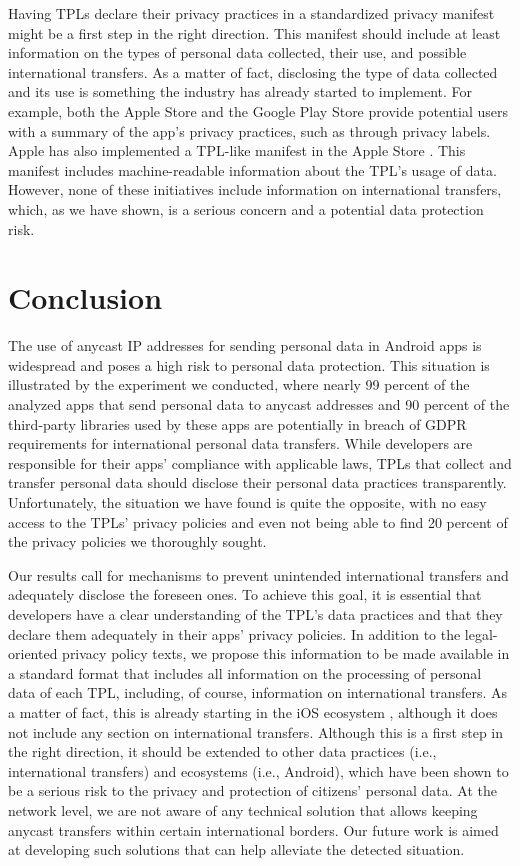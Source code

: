 \documentclass{article}
\begin{document}
Having TPLs declare their privacy practices in a standardized privacy manifest might be a first step in the right direction. This manifest should include at least information on the types of personal data collected, their use, and possible international transfers. As a matter of fact, disclosing the type of data collected and its use is something the industry has already started to implement. For example, both the Apple Store and the Google Play Store provide potential users with a summary of the app's privacy practices, such as through privacy labels. Apple has also implemented a TPL-like manifest in the Apple Store \cite{Third-partyDeveloper}. This manifest includes machine-readable information about the TPL's usage of data. However, none of these initiatives include information on international transfers, which, as we have shown, is a serious concern and a potential data protection risk.

\section{Conclusion}

The use of anycast IP addresses for sending personal data in Android apps is widespread and poses a high risk to personal data protection. This situation is illustrated by the experiment we conducted, where nearly 99 percent of the analyzed apps that send personal data to anycast addresses and 90 percent of the third-party libraries used by these apps are potentially in breach of GDPR requirements for international personal data transfers. While developers are responsible for their apps' compliance with applicable laws, TPLs that collect and transfer personal data should disclose their personal data practices transparently. Unfortunately, the situation we have found is quite the opposite, with no easy access to the TPLs' privacy policies and even not being able to find 20 percent of the privacy policies we thoroughly sought.

Our results call for mechanisms to prevent unintended international transfers and adequately disclose the foreseen ones. To achieve this goal, it is essential that developers have a clear understanding of the TPL's data practices and that they declare them adequately in their apps' privacy policies. In addition to the legal-oriented privacy policy texts, we propose this information to be made available in a standard format that includes all information on the processing of personal data of each TPL, including, of course, information on international transfers. As a matter of fact, this is already starting in the iOS ecosystem \cite{Third-partyDeveloper}, although it does not include any section on international transfers. Although this is a first step in the right direction, it should be extended to other data practices (i.e., international transfers) and ecosystems (i.e., Android), which have been shown to be a serious risk to the privacy and protection of citizens' personal data. At the network level, we are not aware of any technical solution that allows keeping anycast transfers within certain international borders. Our future work is aimed at developing such solutions that can help alleviate the detected situation.
\end{document}
